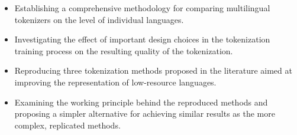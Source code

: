 \begin{itemize}
    \item Establishing a comprehensive methodology for comparing multilingual tokenizers on the level of individual languages.
    \item Investigating the effect of important design choices in the tokenization training process on the resulting quality of the tokenization.
    \item Reproducing three tokenization methods proposed in the literature aimed at improving the representation of low-resource languages.
    \item Examining the working principle behind the reproduced methods and proposing a simpler alternative for achieving similar results as the more complex, replicated methods.
\end{itemize}






